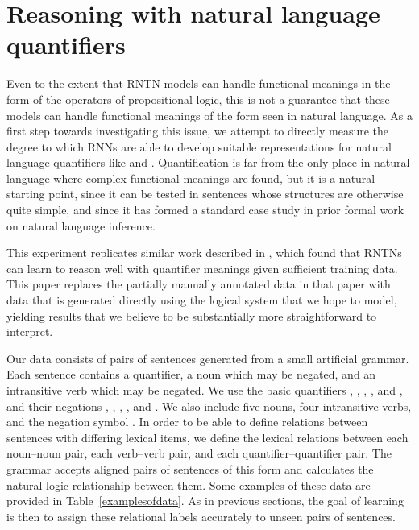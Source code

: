 \section{Reasoning with natural language quantifiers}\label{sec:quantifiers}

Even to the extent that RNTN models can handle functional meanings in
the form of the operators of propositional logic, this is not a
guarantee that these models can handle functional meanings of the form
seen in natural language. As a first step towards investigating this
issue, we attempt to directly measure the degree to which RNNs are
able to develop suitable representations for natural language
quantifiers like  and . Quantification is far from
the only place in natural language where complex functional meanings
are found, but it is a natural starting point, since it can be tested
in sentences whose structures are otherwise quite simple, and since it
has formed a standard case study in prior formal work on natural
language inference.


This experiment replicates similar work described in
\cite{bowman2013can}, which found that RNTNs can learn to reason well
with quantifier meanings given sufficient training data. This paper
replaces the partially manually annotated data in that paper with data
that is generated directly using the logical system that we hope to
model, yielding results that we believe to be substantially more
straightforward to interpret.

Our data consists of pairs of sentences generated from a small
artificial grammar. Each sentence contains a quantifier, a noun which
may be negated, and an intransitive verb which may be negated. We use
the basic quantifiers , , , , and
, and their negations ,
, , , and
. We also include five nouns, four intransitive
verbs, and the negation symbol . In order to be able to define
relations between sentences with differing lexical items, we define
the lexical relations between each noun--noun pair, each verb--verb
pair, and each quantifier--quantifier pair. The grammar accepts
aligned pairs of sentences of this form and calculates the natural
logic relationship between them.  Some examples of these data are
provided in Table~\ref{examplesofdata}.  As in previous sections, the
goal of learning is then to assign these relational labels accurately
to unseen pairs of sentences.

